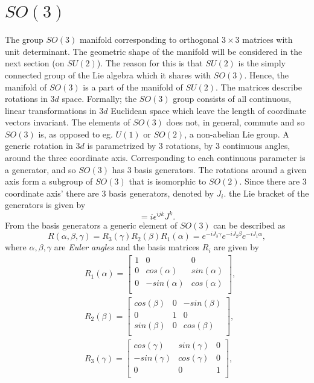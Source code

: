 \section{$SO(3)$}
The group $SO(3)$ manifold corresponding to orthogonal $3\times 3$ matrices with unit determinant. The geometric shape of the manifold will be considered in the next section (on $SU(2)$). The reason for this is that $SU(2)$ is the simply connected group of the Lie algebra which it shares with $SO(3)$. Hence, the manifold of $SO(3)$ is a part of the manifold of $SU(2)$.\newline
The matrices describe rotations in $3d$ space. Formally; the $SO(3)$ group consists of all continuous, linear transformations in $3d$ Euclidean space which leave the length of coordinate vectors invariant. The elements of $SO(3)$ does not, in general, commute and so $SO(3)$ is, as opposed to eg. $U(1)$ or $SO(2)$, a non-abelian Lie group.\newline
A generic rotation in $3d$ is parametrized by $3$ rotations, by $3$ continuous angles, around the three coordinate axis. Corresponding to each continuous parameter is a generator, and so $SO(3)$ has $3$ basis generators. The rotations around a given axis form a subgroup of $SO(3)$ that is isomorphic to $SO(2)$. Since there are $3$ coordinate axis' there are $3$ basis generators, denoted by $J_i$. the Lie bracket of the generators is given by
\begin{equation}
	[J^i,J^j]=i\epsilon^{ijk}J^k.
\end{equation} 
From the basis generators a generic element of $SO(3)$ can be described as
\begin{equation}
	R(\alpha,\beta,\gamma)=R_3(\gamma)R_2(\beta)R_1(\alpha)=e^{-iJ_3\gamma}e^{-iJ_2\beta}e^{-iJ_1\alpha},
\end{equation} 
where $\alpha,\beta,\gamma$ are \emph{Euler angles} and the basis matrices $R_i$ are given by
\begin{equation}
	\begin{split}
		&R_1(\alpha)=\begin{bmatrix}
			1 & 0 & 0 \\
			0 & cos(\alpha) & sin(\alpha)\\
			0 & -sin(\alpha) & cos(\alpha)\\
		\end{bmatrix},\\
		& 
		R_2(\beta)=\begin{bmatrix}
			cos(\beta) & 0 & -sin(\beta) \\
			0 & 1 & 0\\
			sin(\beta) & 0 & cos(\beta)\\
		\end{bmatrix},\\
		& 
		R_3(\gamma)=\begin{bmatrix}
			cos(\gamma) & sin(\gamma) & 0 \\
			-sin(\gamma) & cos(\gamma) & 0\\
			0 & 0 & 1\\
		\end{bmatrix},
	\end{split}
	\label{rot}
\end{equation} 
